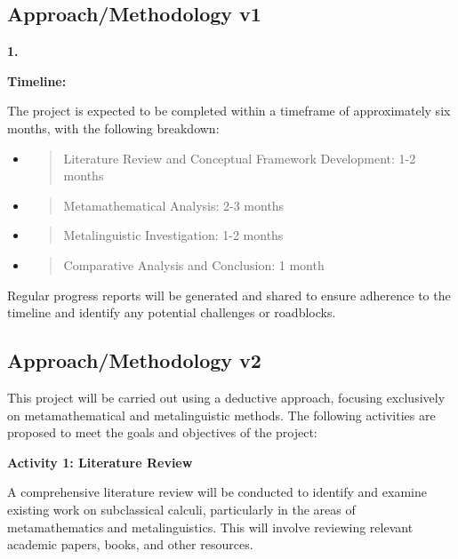 \hypertarget{approachmethodology-v1}{%
\subsection{Approach/Methodology v1}\label{approachmethodology-v1}}

\textbf{1.}

\textbf{Timeline:}

The project is expected to be completed within a timeframe of
approximately six months, with the following breakdown:

\begin{itemize}
\item
  \begin{quote}
  Literature Review and Conceptual Framework Development: 1-2 months
  \end{quote}
\item
  \begin{quote}
  Metamathematical Analysis: 2-3 months
  \end{quote}
\item
  \begin{quote}
  Metalinguistic Investigation: 1-2 months
  \end{quote}
\item
  \begin{quote}
  Comparative Analysis and Conclusion: 1 month
  \end{quote}
\end{itemize}

Regular progress reports will be generated and shared to ensure
adherence to the timeline and identify any potential challenges or
roadblocks.

\hypertarget{approachmethodology-v2}{%
\subsection{Approach/Methodology v2}\label{approachmethodology-v2}}

This project will be carried out using a deductive approach, focusing
exclusively on metamathematical and metalinguistic methods. The
following activities are proposed to meet the goals and objectives of
the project:

\textbf{Activity 1: Literature Review}

A comprehensive literature review will be conducted to identify and
examine existing work on subclassical calculi, particularly in the areas
of metamathematics and metalinguistics. This will involve reviewing
relevant academic papers, books, and other resources.

